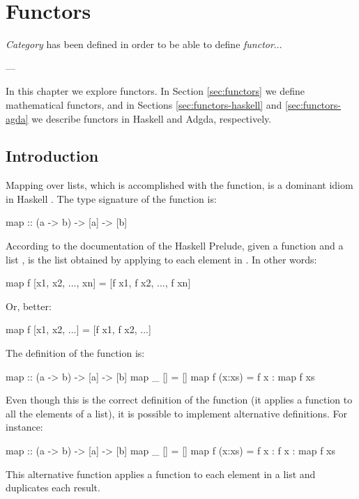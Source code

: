 \chapter{Functors}
\label{chap:functors}

\epigraph{
  \emph{Category} has been defined in order to be able to
  define \emph{functor}...
}{---\textcite[18]{maclane-1998}}

In this chapter we explore functors. In Section \ref{sec:functors} we
define mathematical functors, and in Sections
\ref{sec:functors-haskell} and \ref{sec:functors-agda} we describe
functors in Haskell and Adgda, respectively.

\section{Introduction}
\label{sec:functors-introduction}

Mapping over lists, which is accomplished with the 
function, is a dominant idiom in Haskell \parencite{lipovaca-2011}.
The type signature of the  function is:
\begin{codehaskell}
map :: (a -> b) -> [a] -> [b]
\end{codehaskell}
According to the documentation of the Haskell Prelude, given a
function  and a list ,  is the list obtained by applying  to each
element in . In other words:
\begin{codehaskell}
map f [x1, x2, ..., xn] = [f x1, f x2, ..., f xn]
\end{codehaskell}
Or, better:
\begin{codehaskell}
map f [x1, x2, ...] = [f x1, f x2, ...]
\end{codehaskell}
The definition of the  function is:
\begin{codehaskell}
map :: (a -> b) -> [a] -> [b]
map _ []     = []
map f (x:xs) = f x : map f xs
\end{codehaskell}

Even though this is the correct definition of the 
function (it applies a function to all the elements of a list), it is
possible to implement alternative definitions. For instance:
\begin{codehaskell}
map :: (a -> b) -> [a] -> [b]
map _ []     = []
map f (x:xs) = f x : f x : map f xs
\end{codehaskell}
This alternative  function applies a function to each
element in a list and duplicates each result.

